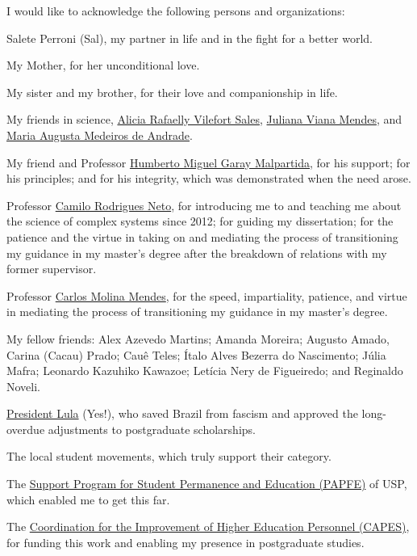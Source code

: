 \documentclass[
  12pt,
  a4paper,
  oneside]{tesesusp}
\begin{document}

\begin{agradecimentos}
I would like to acknowledge the following persons and organizations:

Salete Perroni (Sal), my partner in life and in the fight for a better
world.

My Mother, for her unconditional love.

My sister and my brother, for their love and companionship in life.

My friends in science,
\href{https://orcid.org/0000-0003-0004-4487}{Alicia Rafaelly Vilefort
Sales}, \href{https://orcid.org/0000-0002-8222-5240}{Juliana Viana
Mendes}, and \href{https://orcid.org/0000-0002-9283-9967}{Maria Augusta
Medeiros de Andrade}.

My friend and Professor
\href{https://orcid.org/0000-0002-1164-2055}{Humberto Miguel Garay
Malpartida}, for his support; for his principles; and for his integrity,
which was demonstrated when the need arose.

Professor \href{https://orcid.org/0000-0001-6783-6695}{Camilo Rodrigues
Neto}, for introducing me to and teaching me about the science of
complex systems since 2012; for guiding my dissertation; for the
patience and the virtue in taking on and mediating the process of
transitioning my guidance in my master's degree after the breakdown of
relations with my former supervisor.

Professor \href{https://orcid.org/0000-0003-2916-4415}{Carlos Molina
Mendes}, for the speed, impartiality, patience, and virtue in mediating
the process of transitioning my guidance in my master's degree.

My fellow friends: Alex Azevedo Martins; Amanda Moreira; Augusto Amado,
Carina (Cacau) Prado; Cauê Teles; Ítalo Alves Bezerra do Nascimento;
Júlia Mafra; Leonardo Kazuhiko Kawazoe; Letícia Nery de Figueiredo; and
Reginaldo Noveli.

\href{https://lula.com.br/}{President Lula} (Yes!), who saved Brazil
from fascism and approved the long-overdue adjustments to postgraduate
scholarships.

The local student movements, which truly support their category.

The \href{https://prip.usp.br/apoio-estudantil/}{Support Program for
Student Permanence and Education (PAPFE)} of USP, which enabled me to
get this far.

The \href{https://www.gov.br/capes/}{Coordination for the Improvement of
Higher Education Personnel (CAPES)}, for funding this work and enabling
my presence in postgraduate studies.
\end{agradecimentos}
\end{document}
